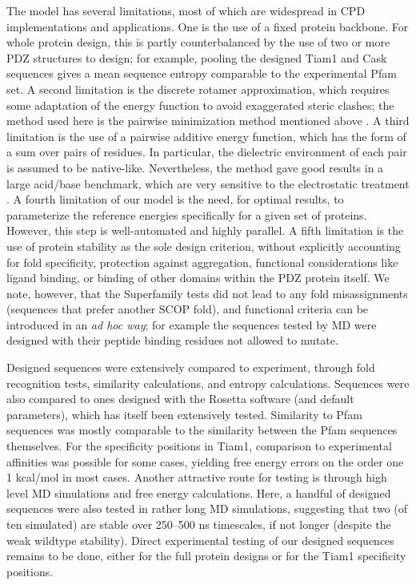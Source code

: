 \documentclass[12pt]{article}
\begin{document}
The model has several limitations, most of which are widespread in CPD implementations and applications. One is the use of a fixed
protein backbone. For whole protein design, this is partly counterbalanced by the use of two or more PDZ structures to design; for
example, pooling the designed Tiam1 and Cask sequences gives a mean sequence entropy comparable to the experimental Pfam set. A second
limitation is the discrete rotamer approximation, which requires some adaptation of the energy function to avoid exaggerated steric
clashes; the method used here is the pairwise minimization method mentioned above \cite{Schmidt08,Simonson13}. A third limitation
is the use of a pairwise additive energy function, which has the form of a sum over pairs of residues. In particular, the dielectric
environment of each pair is assumed to be native-like. Nevertheless, the method gave good results in a large acid/base benchmark,
which are very sensitive to the electrostatic treatment \cite{Polydorides13}. A fourth limitation of our model is the need, for
optimal results, to parameterize the reference energies specifically for a given set of proteins. However, this step is well-automated
and highly parallel. A fifth limitation is the use of protein stability as the sole design criterion, without explicitly accounting
for fold specificity, protection against aggregation, functional considerations like ligand binding, or binding of other domains within
the PDZ protein itself. We note, however, that the Superfamily tests did not lead to any fold misassignments (sequences that prefer
another SCOP fold), and functional criteria can be introduced in an {\it ad hoc way}; for example the sequences tested by MD were
designed with their peptide binding residues not allowed to mutate. 

Designed sequences were extensively compared to experiment, through fold recognition tests, similarity calculations, and entropy
calculations. Sequences were also compared to ones designed with the Rosetta software (and default parameters), which has itself
been extensively tested. Similarity to Pfam sequences was mostly comparable to the similarity between the Pfam sequences themselves.
For the specificity positions in Tiam1, comparison to experimental affinities was possible for some cases, yielding free energy
errors on the order one 1 kcal/mol in most cases. Another attractive route for testing is through high level MD simulations and
free energy calculations. Here, a handful of designed sequences were also tested in rather long MD simulations, suggesting that two
(of ten simulated) are stable over 250--500 ns timescales, if not longer (despite the weak wildtype stability). Direct experimental
testing of our designed sequences remains to be done, either for the full protein designs or for the Tiam1 specificity positions.
\end{document}
